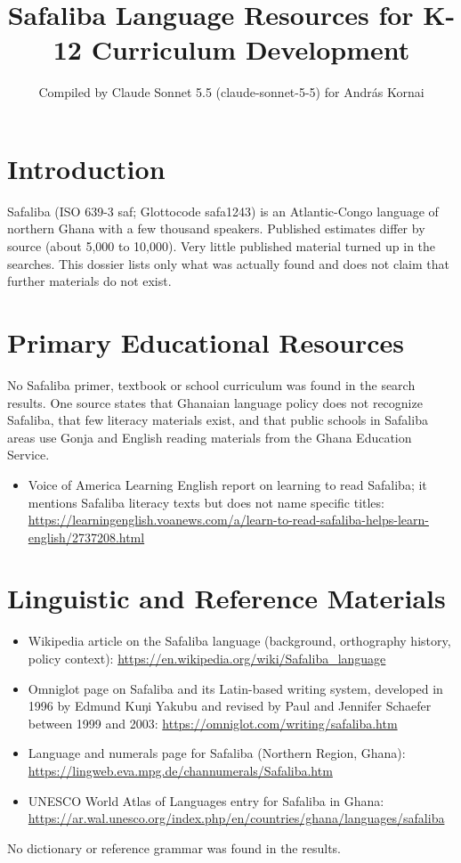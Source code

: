 \documentclass[12pt]{article}
\title{Safaliba Language Resources for K-12 Curriculum Development}
\author{Compiled by Claude Sonnet 5.5 (claude-sonnet-5-5) for Andr\'as Kornai}
\date{}
\begin{document}
\maketitle

\section{Introduction}
Safaliba (ISO 639-3 saf; Glottocode safa1243) is an Atlantic-Congo language of northern Ghana with a few thousand speakers. Published estimates differ by source (about 5,000 to 10,000). Very little published material turned up in the searches. This dossier lists only what was actually found and does not claim that further materials do not exist.

\section{Primary Educational Resources}
No Safaliba primer, textbook or school curriculum was found in the search results. One source states that Ghanaian language policy does not recognize Safaliba, that few literacy materials exist, and that public schools in Safaliba areas use Gonja and English reading materials from the Ghana Education Service.
\begin{itemize}
\item Voice of America Learning English report on learning to read Safaliba; it mentions Safaliba literacy texts but does not name specific titles: \url{https://learningenglish.voanews.com/a/learn-to-read-safaliba-helps-learn-english/2737208.html}
\end{itemize}

\section{Linguistic and Reference Materials}
\begin{itemize}
\item Wikipedia article on the Safaliba language (background, orthography history, policy context): \url{https://en.wikipedia.org/wiki/Safaliba_language}
\item Omniglot page on Safaliba and its Latin-based writing system, developed in 1996 by Edmund Kuŋi Yakubu and revised by Paul and Jennifer Schaefer between 1999 and 2003: \url{https://omniglot.com/writing/safaliba.htm}
\item Language and numerals page for Safaliba (Northern Region, Ghana): \url{https://lingweb.eva.mpg.de/channumerals/Safaliba.htm}
\item UNESCO World Atlas of Languages entry for Safaliba in Ghana: \url{https://ar.wal.unesco.org/index.php/en/countries/ghana/languages/safaliba}
\end{itemize}
No dictionary or reference grammar was found in the results.
\end{document}
